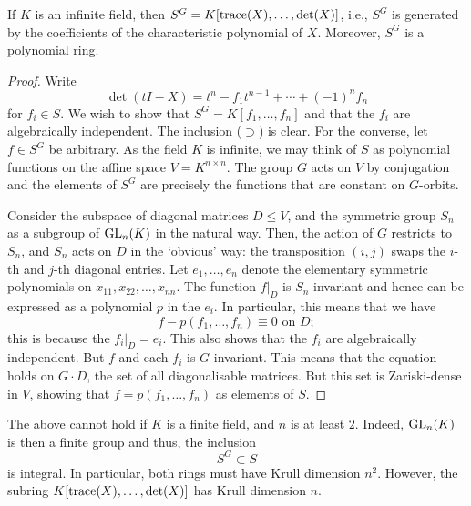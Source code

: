 \documentclass[12pt]{article}
\begin{document}
	\begin{thm}
		If $K$ is an infinite field, then $S^{G} = K[\operatorname{trace}(X), \ldots, \det(X)]$, i.e., $S^{G}$ is generated by the coefficients of the characteristic polynomial of $X$. 
		Moreover, $S^{G}$ is a polynomial ring.
	\end{thm}
	\begin{proof} 
		Write
		\begin{equation*} 
			\det(tI - X) = t^{n} - f_{1} t^{n - 1} + \cdots + (-1)^{n} f_{n}
		\end{equation*}
		for $f_{i} \in S$. 
		We wish to show that $S^{G} = K[f_{1}, \ldots, f_{n}]$ and that the $f_{i}$ are algebraically independent. 
		The inclusion ($\supset$) is clear. 
		For the converse, let $f \in S^{G}$ be arbitrary. 
		As the field $K$ is infinite, we may think of $S$ as polynomial functions on the affine space $V = K^{n \times n}$. 
		The group $G$ acts on $V$ by conjugation and the elements of $S^{G}$ are precisely the functions that are constant on $G$-orbits.

		Consider the subspace of diagonal matrices $D \le V$, and the symmetric group $S_{n}$ as a subgroup of $\operatorname{GL}_{n}(K)$ in the natural way. 
		Then, the action of $G$ restricts to $S_{n}$, and $S_{n}$ acts on $D$ in the `obvious' way: the transposition $(i, j)$ swaps the $i$-th and $j$-th diagonal entries. 
		Let $e_{1}, \ldots, e_{n}$ denote the elementary symmetric polynomials on $x_{11}, x_{22}, \ldots, x_{nn}$.
		The function $f|_{D}$ is $S_{n}$-invariant and hence can be expressed as a polynomial $p$ in the $e_{i}$. 
		In particular, this means that we have
		\begin{equation} \tag{$\dagger$} \label{eq:001}
			f - p(f_{1}, \ldots, f_{n}) \equiv 0 \text{ on $D$};
		\end{equation}
		this is because the $f_{i}|_{D} = e_{i}$. 
		This also shows that the $f_{i}$ are algebraically independent. 
		But $f$ and each $f_{i}$ is $G$-invariant. 
		This means that the equation  holds on $G \cdot D$, the set of all diagonalisable matrices. 
		But this set is Zariski-dense in $V$, showing that $f = p(f_{1}, \ldots, f_{n})$ as elements of $S$.
	\end{proof}

	The above cannot hold if $K$ is a finite field, and $n$ is at least $2$. 
	Indeed, $\operatorname{GL}_{n}(K)$ is then a finite group and thus, the inclusion
	\begin{equation*} 
		S^{G} \subset S
	\end{equation*}
	is integral. In particular, both rings must have Krull dimension $n^{2}$. 
	However, the subring $K[\operatorname{trace}(X), \ldots, \det(X)]$ has Krull dimension $n$.
\end{document}

